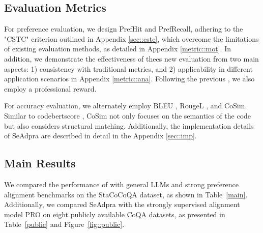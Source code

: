 \subsection{Evaluation Metrics}
\label{sec: metric}
For preference evaluation, we design PrefHit and PrefRecall, adhering to the "CSTC" criterion outlined in Appendix \ref{sec::cstc}, which overcome the limitations of existing evaluation methods, as detailed in Appendix \ref{metric::mot}.
In addition, we demonstrate the effectiveness of thees new evaluation from two main aspects: 1) consistency with traditional metrics, and 2) applicability in different application scenarios in Appendix \ref{metric::ana}.
Following the previous \cite{song2024preference}, we also employ a professional reward.

For accuracy evaluation, we alternately employ BLEU \cite{papineni2002bleu}, RougeL \cite{lin2004rouge}, and CoSim. Similar to codebertscore \cite{zhou2023codebertscore}, CoSim not only focuses on the semantics of the code but also considers structural matching.
Additionally, the implementation details of SeAdpra are described in detail in the Appendix \ref{sec::imp}.
\subsection{Main Results}
We compared the performance of \shortname with general LLMs and strong preference alignment benchmarks on the StaCoCoQA dataset, as shown in Table~\ref{main}. Additionally, we compared SeAdpra with the strongly supervised alignment model PRO \cite{song2024preference} on eight publicly available CoQA datasets, as presented in Table~\ref{public} and Figure~\ref{fig::public}.

